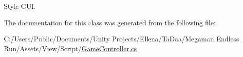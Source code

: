 Style G\+UI. 



The documentation for this class was generated from the following file\+:\begin{DoxyCompactItemize}
\item 
C\+:/\+Users/\+Public/\+Documents/\+Unity Projects/\+Ellena/\+Ta\+Daa/\+Megaman Endless Run/\+Assets/\+View/\+Script/\hyperlink{_game_controller_8cs}{Game\+Controller.\+cs}\end{DoxyCompactItemize}
